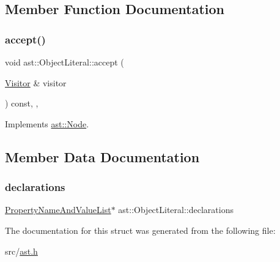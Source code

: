 \subsection{Member Function Documentation}
\mbox{\label{structast_1_1_object_literal_a0268366bc6b725a3ae259ee82d78b1fb}} 
\subsubsection{\texorpdfstring{accept()}{accept()}}
{\footnotesize\ttfamily void ast\+::\+Object\+Literal\+::accept (\begin{DoxyParamCaption}\item[{\hyperlink{structast_1_1_visitor}{Visitor} \&}]{visitor }\end{DoxyParamCaption}) const\hspace{0.3cm}{\ttfamily [inline]}, {\ttfamily [override]}, {\ttfamily [virtual]}}



Implements \hyperlink{structast_1_1_node_abc089ee6caaf06a4445ebdd8391fdebc}{ast\+::\+Node}.



\subsection{Member Data Documentation}
\mbox{\label{structast_1_1_object_literal_a31980dac525097f3bd0313d908c473b5}} 
\subsubsection{\texorpdfstring{declarations}{declarations}}
{\footnotesize\ttfamily \hyperlink{structast_1_1_property_name_and_value_list}{Property\+Name\+And\+Value\+List}$\ast$ ast\+::\+Object\+Literal\+::declarations}



The documentation for this struct was generated from the following file\+:\begin{DoxyCompactItemize}
\item 
src/\hyperlink{ast_8h}{ast.\+h}\end{DoxyCompactItemize}
